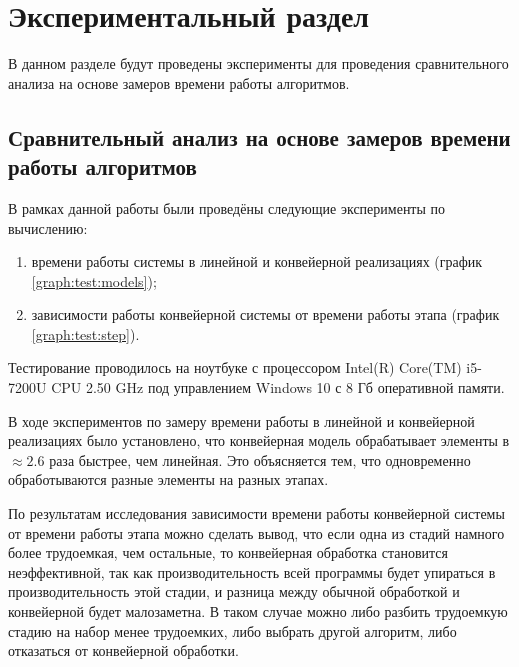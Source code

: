 \chapter{Экспериментальный раздел}
\label{cha:research}
    В данном разделе будут проведены эксперименты для проведения 
    сравнительного анализа на основе замеров времени работы алгоритмов.

    \section{Сравнительный анализ на основе замеров времени работы алгоритмов}
        В рамках данной работы были проведёны следующие эксперименты по вычислению: 
        \begin{enumerate}
            \item времени работы системы в линейной и конвейерной реализациях (график \ref{graph:test:models});
            \item зависимости работы конвейерной системы от времени работы этапа (график \ref{graph:test:step}).
        \end{enumerate}

        Тестирование проводилось на ноутбуке с процессором
        Intel(R) Core(TM) i5-7200U CPU 2.50 GHz \cite{processor-i5-7200u}
        под управлением Windows 10 с 8 Гб оперативной памяти.

        В ходе экспериментов по замеру времени работы в линейной и конвейерной реализациях было установлено,
        что конвейерная модель обрабатывает элементы в $ \approx 2.6 $ раза
        быстрее, чем линейная. Это объясняется тем,
        что одновременно обработываются разные элементы на разных этапах.
        
        По результатам исследования зависимости времени работы конвейерной системы от времени работы этапа  
        можно сделать вывод, что если одна из стадий намного более трудоемкая, чем остальные,
        то конвейерная обработка становится неэффективной,
        так как производительность всей программы будет упираться в производительность этой стадии,
        и разница между обычной обработкой и конвейерной будет малозаметна.
        В таком случае можно либо разбить трудоемкую стадию на набор менее трудоемких,
        либо выбрать другой алгоритм, либо отказаться от конвейерной обработки.


